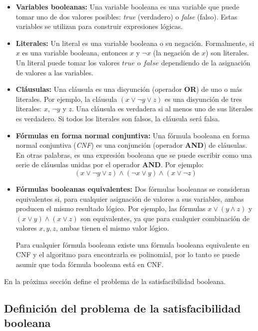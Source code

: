 \documentclass[12pt]{article}
\begin{document}
\begin{itemize}
  \item \textbf{Variables booleanas:}
        Una variable booleana es una variable que puede tomar uno de dos valores posibles: \textit{true} (verdadero) o \textit{false} (falso). Estas variables se utilizan para construir expresiones lógicas.
  \item \textbf{Literales:}
        Un literal es una variable booleana o su negación. Formalmente, si \( x \) es una variable booleana, entonces \( x \) y \( \neg x \) (la negación de \( x \)) son literales. Un literal puede tomar los valores \( true \) o \( false \) dependiendo de la asignación de valores a las variables.
  \item  \textbf{Cláusulas:}
        Una cláusula es una disyunción (operador \textbf{OR}) de uno o más literales. Por ejemplo, la cláusula \( (x \vee \neg y \vee z) \) es una disyunción de tres literales: \( x \), \( \neg y \) y \( z \). Una cláusula es verdadera si al menos uno de sus literales es verdadero. Si todos los literales son falsos, la cláusula será falsa.
  \item \textbf{Fórmulas en forma normal conjuntiva:}
        Una fórmula booleana en forma normal conjuntiva (\textit{CNF}) es una conjunción (operador \textbf{AND}) de cláusulas. En otras palabras, es una expresión booleana que se puede escribir como una serie de cláusulas unidas por el operador \textbf{AND}. Por ejemplo:        
        \[
          (x \vee \neg y \vee z) \wedge (\neg x \vee y) \wedge (x \vee \neg z)
        \]
  \item \textbf{Fórmulas booleanas equivalentes:}
        Dos fórmulas booleanas se consideran equivalentes si, para cualquier asignación de valores a sus variables, ambas producen el mismo resultado lógico. Por ejemplo, las fórmulas \( x \vee (y \wedge z) \) y \( (x \vee y) \wedge (x \vee z) \) son equivalentes, ya que para cualquier combinación de valores \( x, y, z \), ambas tienen el mismo valor lógico.
        
        Para cualquier fórmula booleana existe una fórmula booleana equivalente en CNF \cite{authomataTheory} y 
        el algoritmo para encontrarla es polinomial, por lo tanto se puede asumir que toda fórmula booleana está en CNF.
        
\end{itemize}

En la próxima sección define el problema de la satisfacibilidad booleana.

\subsection{Definición del problema de la satisfacibilidad booleana}
\end{document}
